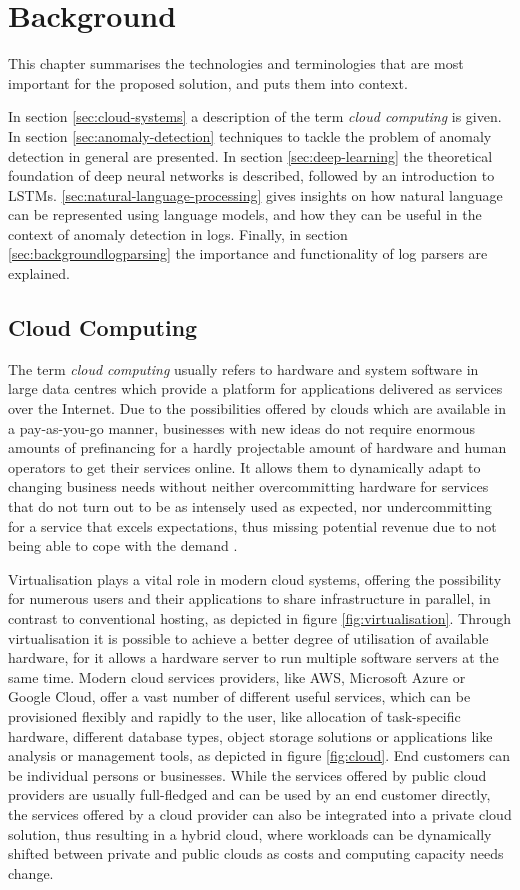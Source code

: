 \chapter{Background\label{cha:background}}
This chapter summarises the technologies and terminologies that are most important for the proposed solution, and puts them into context.

In section \ref{sec:cloud-systems} a description of the term \textit{cloud computing} is given. In section \ref{sec:anomaly-detection} techniques to tackle the problem of anomaly detection in general are presented. In section \ref{sec:deep-learning} the theoretical foundation of deep neural networks is described, followed by an introduction to LSTMs. \ref{sec:natural-language-processing} gives insights on how natural language can be represented using language models, and how they can be useful in the context of anomaly detection in logs. Finally, in section \ref{sec:backgroundlogparsing} the importance and functionality of log parsers are explained.

\section{Cloud Computing\label{sec:cloud-systems}}
The term \textit{cloud computing} usually refers to hardware and system software in large data centres which provide a platform for applications delivered as services over the Internet. Due to the possibilities offered by clouds which are available in a pay-as-you-go manner, businesses with new ideas do not require enormous amounts of prefinancing for a hardly projectable amount of hardware and human operators to get their services online. It allows them to dynamically adapt to changing business needs without neither overcommitting hardware for services that do not turn out to be as intensely used as expected, nor undercommitting for a service that excels expectations, thus missing potential revenue due to not being able to cope with the demand \cite{armbrust2010view}.

Virtualisation plays a vital role in modern cloud systems, offering the possibility for numerous users and their applications to share infrastructure in parallel, in contrast to conventional hosting, as depicted in figure \ref{fig:virtualisation}. Through virtualisation it is possible to achieve a better degree of utilisation of available hardware, for it allows a hardware server to run multiple software servers at the same time. Modern cloud services providers, like AWS, Microsoft Azure or Google Cloud, offer a vast number of different useful services, which can be provisioned flexibly and rapidly to the user, like allocation of task-specific hardware, different database types, object storage solutions or applications like analysis or management tools, as depicted in figure \ref{fig:cloud}. End customers can be individual persons or businesses. While the services offered by public cloud providers are usually full-fledged and can be used by an end customer directly, the services offered by a cloud provider can also be integrated into a private cloud solution, thus resulting in a hybrid cloud, where workloads can be dynamically shifted between private and public clouds as costs and computing capacity needs change.


